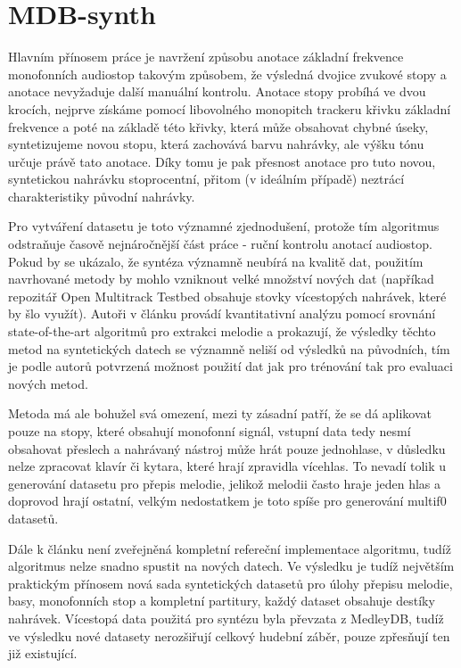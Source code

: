 \section{MDB-synth}\label{sec:mdb_synth}

Hlavním přínosem práce \cite{Salamon2017} je navržení způsobu anotace základní frekvence monofonních audiostop takovým způsobem, že výsledná dvojice zvukové stopy a anotace nevyžaduje další manuální kontrolu. Anotace stopy probíhá ve dvou krocích, nejprve získáme pomocí libovolného monopitch trackeru křivku základní frekvence a poté na základě této křivky, která může obsahovat chybné úseky, syntetizujeme novou stopu, která zachovává barvu nahrávky, ale výšku tónu určuje právě tato anotace. Díky tomu je pak přesnost anotace pro tuto novou, syntetickou nahrávku stoprocentní, přitom (v ideálním případě) neztrácí charakteristiky původní nahrávky.

Pro vytváření datasetu je toto významné zjednodušení, protože tím algoritmus odstraňuje časově nejnáročnější část práce - ruční kontrolu anotací audiostop. Pokud by se ukázalo, že syntéza významně neubírá na kvalitě dat, použitím navrhované metody by mohlo vzniknout velké množství nových dat (napříkad repozitář Open Multitrack Testbed obsahuje stovky vícestopých nahrávek, které by šlo využít). Autoři v článku provádí kvantitativní analýzu pomocí srovnání state-of-the-art algoritmů pro extrakci melodie a prokazují, že výsledky těchto metod na syntetických datech se významně neliší od výsledků na původních, tím je podle autorů potvrzená možnost použití dat jak pro trénování tak pro evaluaci nových metod.

Metoda má ale bohužel svá omezení, mezi ty zásadní patří, že se dá aplikovat pouze na stopy, které obsahují monofonní signál, vstupní data tedy nesmí obsahovat přeslech a nahrávaný nástroj může hrát pouze jednohlase, v důsledku nelze zpracovat klavír či kytara, které hrají zpravidla vícehlas. To nevadí tolik u generování datasetu pro přepis melodie, jelikož melodii často hraje jeden hlas a doprovod hrají ostatní, velkým nedostatkem je toto spíše pro generování multif0 datasetů.

Dále k článku není zveřejněná kompletní refereční implementace algoritmu, tudíž algoritmus nelze snadno spustit na nových datech. Ve výsledku je tudíž největším praktickým přínosem nová sada syntetických datasetů pro úlohy přepisu melodie, basy, monofonních stop a kompletní partitury, každý dataset obsahuje destíky nahrávek. Vícestopá data použitá pro syntézu byla převzata z MedleyDB, tudíž ve výsledku nové datasety nerozšiřují celkový hudební záběr, pouze zpřesňují ten již existující.

